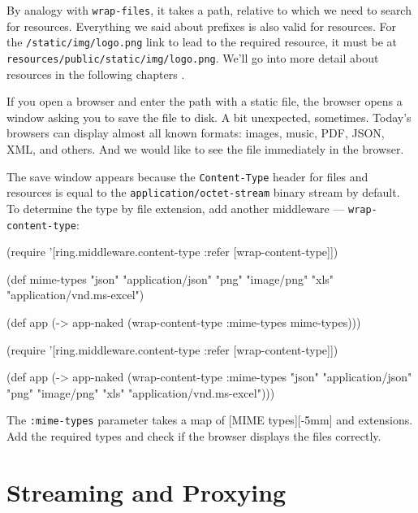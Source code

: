 By analogy with \verb|wrap-files|, it takes a path, relative to which we need to search for resources. Everything we said about prefixes is also valid for resources. For the \verb|/static/img/logo.png| link to lead to the required resource, it must be at \verb|resources/public/static/img/logo.png|. We'll go into more detail about resources in the following chapters .

If you open a browser and enter the path with a static file, the browser opens a window asking you to save the file to disk. A bit unexpected, sometimes. Today's browsers can display almost all known formats:
images, music, PDF, JSON, XML, and others. And we would like to see the file immediately in the browser.

The save window appears because the \verb|Content-Type| header for files and resources is equal to the \verb|application/octet-stream| binary stream by default. To determine the type by file extension, add another middleware — \verb|wrap-content-type|:

\ifx\DEVICETYPE\MOBILE

\begin{clojure}
(require '[ring.middleware.content-type
           :refer [wrap-content-type]])

(def mime-types
      {"json" "application/json"
       "png" "image/png"
       "xls" "application/vnd.ms-excel"})

(def app
  (-> app-naked
      (wrap-content-type
        {:mime-types mime-types})))
\end{clojure}

\else

\begin{clojure}
(require '[ring.middleware.content-type
           :refer [wrap-content-type]])

(def app
  (-> app-naked
      (wrap-content-type
       {:mime-types
         {"json" "application/json"
          "png" "image/png"
          "xls" "application/vnd.ms-excel"}})))
\end{clojure}

\fi

The \verb|:mime-types| parameter takes a map of [MIME types][-5mm] and extensions. Add the required types and check if the browser displays the files correctly.


\section{Streaming and Proxying}

